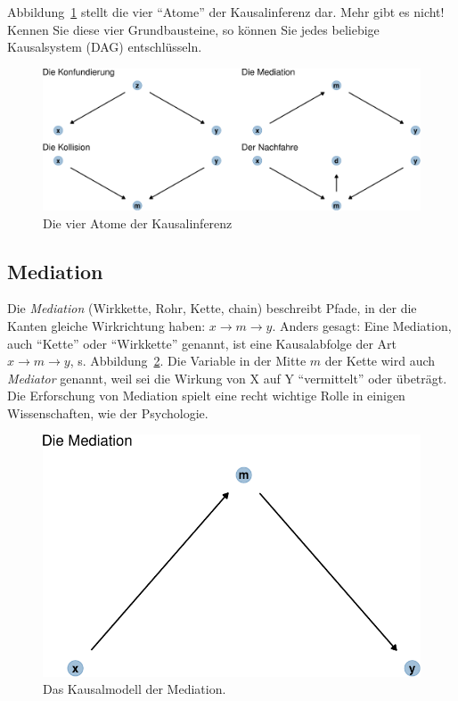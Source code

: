 \documentclass[
  a4paper,
  DIV=11]{scrreprt}
\theoremstyle{definition}
\theoremstyle{remark}
\begin{document}
Abbildung~\ref{fig-four-atoms} stellt die vier ``Atome'' der
Kausalinferenz dar. Mehr gibt es nicht! Kennen Sie diese vier
Grundbausteine, so können Sie jedes beliebige Kausalsystem (DAG)
entschlüsseln.

\begin{figure}

{\centering \includegraphics{./kausal_files/figure-pdf/fig-four-atoms-1.pdf}

}

\caption{\label{fig-four-atoms}Die vier Atome der Kausalinferenz}

\end{figure}

\hypertarget{mediation}{%
\subsection{Mediation}\label{mediation}}

Die \emph{Mediation} (Wirkkette, Rohr, Kette, chain) beschreibt Pfade,
in der die Kanten gleiche Wirkrichtung haben:
\(x \rightarrow m \rightarrow y\). Anders gesagt: Eine Mediation, auch
``Kette'' oder ``Wirkkette'' genannt, ist eine Kausalabfolge der Art
\(x \rightarrow m \rightarrow y\), s. Abbildung~\ref{fig-med1}. Die
Variable in der Mitte \(m\) der Kette wird auch \emph{Mediator} genannt,
weil sei die Wirkung von X auf Y ``vermittelt'' oder übeträgt. Die
Erforschung von Mediation spielt eine recht wichtige Rolle in einigen
Wissenschaften, wie der Psychologie.

\begin{figure}

{\centering \includegraphics{./kausal_files/figure-pdf/fig-med1-1.pdf}

}

\caption{\label{fig-med1}Das Kausalmodell der Mediation.}

\end{figure}
\end{document}
